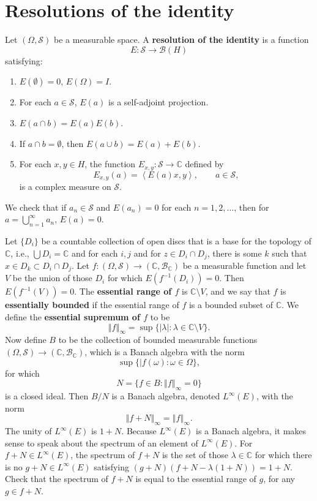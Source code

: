 \documentclass{article}
\newcommand{\inner}[2]{\left\langle #1, #2 \right\rangle}
\newcommand{\norm}[1]{\left\Vert #1 \right\Vert}
\theoremstyle{definition}
\begin{document}
\section{Resolutions of the identity}
Let $(\Omega,\mathscr{S})$ be a measurable space. A \textbf{resolution of the identity} is a function
\[
E:\mathscr{S} \to \mathscr{B}(H)
\]
satisfying:
\begin{enumerate}
\item $E(\emptyset)=0$, $E(\Omega)=I$.
\item For each $a \in \mathscr{S}$, $E(a)$ is a self-adjoint projection.
\item $E(a \cap b) = E(a) E(b)$.
\item If $a \cap b = \emptyset$, then $E(a \cup b) = E(a)+E(b)$.
\item For each $x,y \in H$, the function $E_{x,y}:\mathscr{S} \to \mathbb{C}$ defined by
\[
E_{x,y}(a) = \inner{E(a)x}{y}, \qquad a \in \mathscr{S},
\]
is a complex measure on $\mathscr{S}$.
\end{enumerate}

We check that if $a_n \in \mathscr{S}$ and $E(a_n)=0$ for each $n=1,2,\ldots$, then for $a=\bigcup_{n=1}^\infty a_n$,
$E(a)=0$. 

Let $\{D_i\}$ be a countable collection of open discs that is a base for the topology of $\mathbb{C}$, i.e.,
$\bigcup D_i = \mathbb{C}$ and for each $i,j$ and for $z \in D_i \cap D_j$, there is some $k$ such that
$x \in D_k \subset D_i \cap D_j$. 
Let $f:(\Omega,\mathscr{S}) \to (\mathbb{C},\mathscr{B}_{\mathbb{C}})$ be a measurable function and let
$V$ be the union of those $D_i$ for which $E(f^{-1}(D_i))=0$. Then
$E(f^{-1}(V))=0$. The \textbf{essential range of $f$} is $\mathbb{C} \setminus V$, and we say that
$f$ is \textbf{essentially bounded} if the essential range of $f$ is a bounded subset of $\mathbb{C}$. We define 
the \textbf{essential supremum of $f$} to be
\[
\norm{f}_\infty = \sup\{|\lambda|: \lambda \in \mathbb{C} \setminus V\}.
\]
Now define $B$ to be the collection of bounded  measurable functions $(\Omega,\mathscr{S}) \to (\mathbb{C},\mathscr{B}_{\mathbb{C}})$, which is a Banach
algebra with the norm
\[
\sup\{|f(\omega): \omega \in \Omega\},
\]
for which
\[
N = \{f \in B: \norm{f}_\infty =0\}
\]
is a closed ideal. Then $B/N$ is a Banach algebra, denoted $L^\infty(E)$, with the norm
\[
\norm{f+N}_\infty = \norm{f}_\infty.
\]
The unity of $L^\infty(E)$ is $1+N$.
Because $L^\infty(E)$ is a Banach algebra, it makes sense to speak about the spectrum of an element of $L^\infty(E)$. For
$f+N \in L^\infty(E)$, the spectrum of $f+N$ is the set of those $\lambda \in \mathbb{C}$ for which there is no $g+N \in L^\infty(E)$ satisfying
$(g+N)(f+N-\lambda(1+N))=1+N$. Check that the spectrum of $f+N$ is equal to the essential range of $g$, for any $g \in f+N$. 
\end{document}

